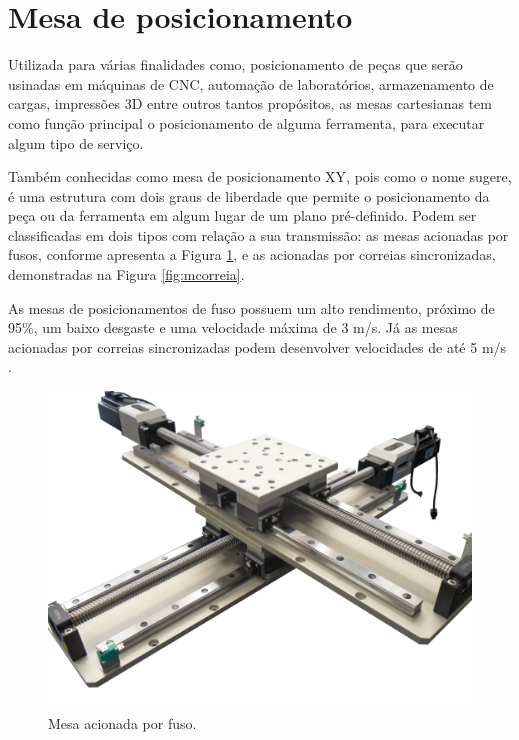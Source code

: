 \section{Mesa de posicionamento}\label{sec:mesa}

Utilizada para várias finalidades como, posicionamento de peças que serão usinadas em máquinas de 
\ac{CNC}, automação de laboratórios, armazenamento de cargas, impressões 3D entre 
outros tantos propósitos, as mesas cartesianas tem como função principal o posicionamento de alguma 
ferramenta, para executar algum tipo de serviço.

Também conhecidas como mesa de posicionamento XY, pois como o nome sugere, é uma estrutura com dois graus 
de liberdade que permite o posicionamento da peça ou da ferramenta em algum lugar de um plano pré-definido. 
Podem ser classificadas em dois tipos com relação a sua transmissão: as mesas acionadas por fusos, conforme 
apresenta a Figura \ref{fig:mfuso}, e as acionadas por correias sincronizadas, demonstradas na Figura \ref{fig:mcorreia}.

As mesas de posicionamentos de fuso possuem um alto rendimento, próximo de 95\%, um baixo desgaste e uma 
velocidade máxima de 3 m/s. Já as mesas acionadas por correias sincronizadas podem desenvolver velocidades 
de até 5 m/s \cite{rocha2015retrofitting}.

\begin{figure}[H]
\centering
\caption{Mesa acionada por fuso.}\label{fig:mfuso}
\includegraphics[scale = 0.3]{figuras/mfuso}
\end{figure}

